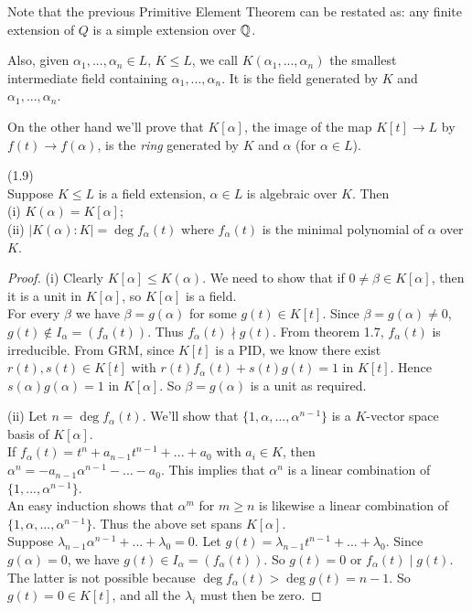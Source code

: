 \documentclass[a4paper]{article}
\begin{document}
Note that the previous Primitive Element Theorem can be restated as: any finite extension of $Q$ is a simple extension over $\mathbb{Q}$.

Also, given $\alpha_1,...,\alpha_n \in L$, $K \leq L$, we call $K(\alpha_1,...,\alpha_n)$ the smallest intermediate field containing $\alpha_1,...,\alpha_n$. It is the field generated by $K$ and $\alpha_1,...,\alpha_n$. 

On the other hand we'll prove that $K[\alpha]$, the image of the map $K[t] \to L$ by $f(t) \to f(\alpha)$, is the \emph{ring} generated by $K$ and $\alpha$ (for $\alpha \in L$).

\begin{thm} (1.9)\\
Suppose $K \leq L$ is a field extension, $\alpha \in L$ is algebraic over $K$. Then\\
(i) $K(\alpha) = K[\alpha]$;\\
(ii) $|K(\alpha):K| = \deg f_\alpha (t)$ where $f_\alpha(t)$ is the minimal polynomial of $\alpha$ over $K$.
\begin{proof}
(i) Clearly $K[\alpha] \leq K(\alpha)$. We need to show that if $0 \neq \beta \in K[\alpha]$, then it is a unit in $K[\alpha]$, so $K[\alpha] $  is a field.\\
For every $\beta$ we have $\beta=g(\alpha)$ for some $g(t) \in K[t]$. Since $\beta = g(\alpha) \neq 0$, $g(t) \not\in I_\alpha = (f_\alpha(t))$. Thus $f_\alpha(t) \nmid g(t)$. From theorem 1.7, $f_\alpha(t)$ is irreducible. From GRM, since $K[t]$ is a PID, we know there exist $r(t),s(t) \in K[t]$ with $r(t) f_\alpha(t) + s(t) g(t) = 1$ in $K[t]$. Hence $s(\alpha) g(\alpha) = 1$ in $K[\alpha]$. So $\beta = g(\alpha)$ is a unit as required.

(ii) Let $n = \deg f_\alpha(t)$. We'll show that $\{1,\alpha,...,\alpha^{n-1}\}$ is a $K$-vector space basis of $K[\alpha]$.\\
If $f_\alpha(t) = t^n + a_{n-1}t^{n-1}+...+a_0$ with $a_i \in K$, then $\alpha^n = -a_{n-1}\alpha^{n-1} -...-a_0$. This implies that $\alpha^n$ is a linear combination of $\{1,...,\alpha^{n-1}\}$.\\
An easy induction shows that $\alpha^m$ for $m \geq n$ is likewise a linear combination of $\{1,\alpha,...,\alpha^{n-1}\}$. Thus the above set spans $K[\alpha]$.\\
Suppose $\lambda_{n-1}\alpha^{n-1}+...+\lambda_0=0$. Let $g(t) = \lambda_{n-1}t^{n-1}+...+\lambda_0$. Since $g(\alpha)=0$, we have $g(t) \in I_\alpha = (f_\alpha(t))$. So $g(t) = 0$ or $f_\alpha(t) \mid g(t)$. The latter is not possible because $\deg f_\alpha(t) > \deg g(t) = n-1$. So $g(t)=0 \in K[t]$, and all the $\lambda_i$ must then be zero.
\end{proof}
\end{thm}
\end{document}
